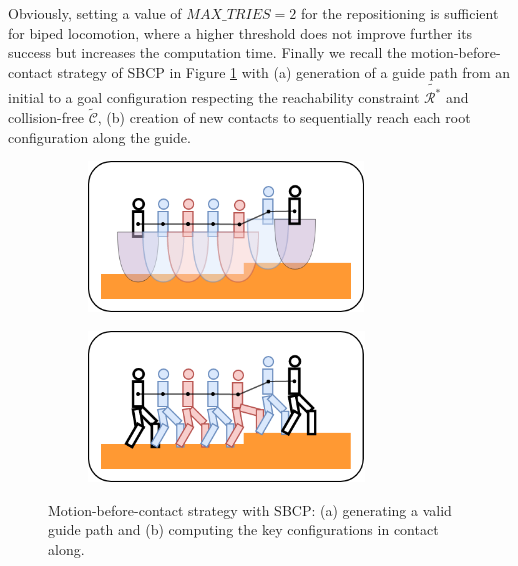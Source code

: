 Obviously, setting a value of $MAX\_TRIES=2$ for the repositioning is sufficient for biped locomotion, where a higher threshold does not improve further its success but increases the computation time.
Finally we recall the motion-before-contact strategy of SBCP in Figure \ref{fig:cp-sb:sbcp_explanation} with (a) generation of a guide path from an initial to a goal configuration respecting the reachability constraint $\tilde{\mathcal{R}^*}$ and collision-free $\tilde{\mathcal{C}}$, (b) creation of new contacts to sequentially reach each root configuration along the guide.

\begin{figure}[h]
    \captionsetup[subfigure]{justification=centering}
    \centering
    \begin{subfigure}[t]{.48\linewidth}
    \includegraphics[width=\textwidth, height=4cm]{Figures/Chapter_CPSB/sbcp_explanation_0.png}
    \caption{}
    \end{subfigure}
    \begin{subfigure}[t]{.48\linewidth}
    \includegraphics[width=\textwidth, height=4cm]{Figures/Chapter_CPSB/sbcp_explanation_1.png}
    \caption{}
    \end{subfigure}
    \caption{Motion-before-contact strategy with SBCP: (a) generating a valid guide path and (b) computing the key configurations in contact along.}
    \label{fig:cp-sb:sbcp_explanation}
\end{figure}

